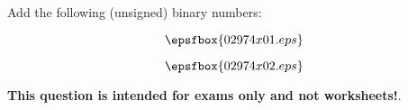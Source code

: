 

Add the following (unsigned) binary numbers:

\vskip 10pt

$$\epsfbox{02974x01.eps}$$

\vskip 10pt







$$\epsfbox{02974x02.eps}$$







{\bf This question is intended for exams only and not worksheets!}.




